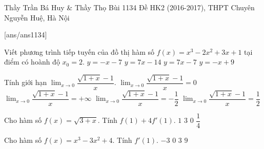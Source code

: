 \begin{name}
{Thầy Trần Bá Huy \& Thầy Thọ Bùi}
{1134 Đề HK2 (2016-2017), THPT Chuyên Nguyễn Huệ, Hà Nội}
\end{name}
\setcounter{ex}{0}\setcounter{bt}{0}
[ans/ans1134]
\begin{ex}%
Viết phương trình tiếp tuyến của đồ thị hàm số $f(x)=x^3-2x^2+3x+1$ tại điểm có hoành độ $x_0=2$.
\choice
{$y=-x-7$}
{$y=7x-14$}
{\True $y=7x-7$}
{$y=-x+9$}
\end{ex}


\begin{ex}%
Tính giới hạn $\displaystyle\lim_{x\to 0}\dfrac{\sqrt{1+x}-1}{x}$.
\choice
{$\displaystyle\lim_{x\to 0}\dfrac{\sqrt{1+x}-1}{x}=0$}
{$\displaystyle\lim_{x\to 0}\dfrac{\sqrt{1+x}-1}{x}=+\infty$}
{$\displaystyle\lim_{x\to 0}\dfrac{\sqrt{1+x}-1}{x}=-\dfrac{1}{2}$}
{\True $\displaystyle\lim_{x\to 0}\dfrac{\sqrt{1+x}-1}{x}=\dfrac{1}{2}$}
\end{ex}


\begin{ex}%
Cho hàm số $f(x)=\sqrt{3+x}$. Tính $f(1)+4f'(1)$.
\choice
{$1$}
{\True $3$}
{$0$}
{$\dfrac{1}{4}$}
\end{ex}


\begin{ex}%
Cho hàm số $f(x)=x^3-3x^2+4$. Tính $f'(1)$.
\choice
{\True $-3$}
{$0$}
{$3$}
{$9$}
\end{ex}


